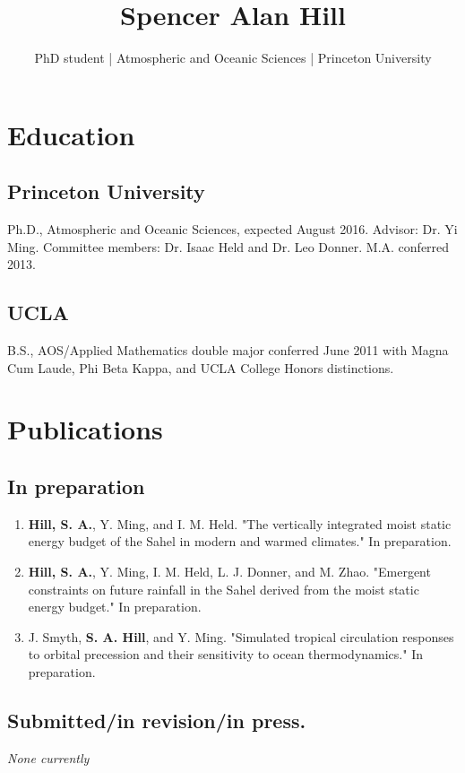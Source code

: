 \documentclass{article}
\author{PhD student | Atmospheric and Oceanic Sciences | Princeton University}
\date{}
\title{Spencer Alan Hill}
\begin{document}
\maketitle
\section*{Education}
\label{sec:orgheadline3}
\subsection*{Princeton University}
\label{sec:orgheadline1}
Ph.D., Atmospheric and Oceanic Sciences, expected August 2016.
Advisor: Dr. Yi Ming.  Committee members: Dr. Isaac Held and Dr. Leo Donner.
M.A. conferred 2013.
\subsection*{UCLA}
\label{sec:orgheadline2}
B.S., AOS/Applied Mathematics double major conferred June 2011 with
Magna Cum Laude, Phi Beta Kappa, and UCLA College Honors distinctions.
\section*{Publications}
\label{sec:orgheadline8}
\subsection*{In preparation}
\label{sec:orgheadline4}
\begin{enumerate}
\item \textbf{Hill, S. A.}, Y. Ming, and I. M. Held.  "The vertically integrated moist
static energy budget of the Sahel in modern and warmed climates."  In
preparation.
\item \textbf{Hill, S. A.}, Y. Ming, I. M. Held, L. J. Donner, and M. Zhao.  "Emergent
constraints on future rainfall in the Sahel derived from the moist static
energy budget."  In preparation.
\item J. Smyth, \textbf{S. A. Hill}, and Y. Ming.  "Simulated tropical circulation responses to
orbital precession and their sensitivity to ocean thermodynamics."  In
preparation.
\end{enumerate}
\subsection*{Submitted/in revision/in press.}
\label{sec:orgheadline5}
\emph{None currently}
\end{document}
